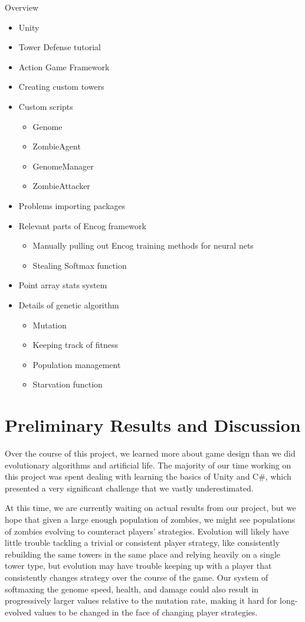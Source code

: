 \documentclass[letterpaper]{article}
\begin{document}
Overview
\begin{itemize}
    \item Unity
    \item Tower Defense tutorial
    \item Action Game Framework
    \item Creating custom towers
    \item Custom scripts
        \begin{itemize}
            \item Genome
            \item ZombieAgent
            \item GenomeManager
            \item ZombieAttacker
        \end{itemize}
    \item Problems importing packages
    \item Relevant parts of Encog framework
        \begin{itemize}
            \item Manually pulling out Encog training methods for neural nets
            \item Stealing Softmax function
        \end{itemize}
    \item Point array stats system
    \item Details of genetic algorithm
        \begin{itemize}
            \item Mutation
            \item Keeping track of fitness
            \item Population management
            \item Starvation function
        \end{itemize}
\end{itemize}


\section{Preliminary Results and Discussion}
Over the course of this project, we learned more about game design than we did evolutionary algorithms and artificial life. The majority of our time working on this project was spent dealing with learning the basics of Unity and C\#, which presented a very significant challenge that we vastly underestimated.

At this time, we are currently waiting on actual results from our project, but
we hope that given a large enough population of zombies, we might see
populations of zombies evolving to counteract players' strategies. Evolution
will likely have little trouble tackling a trivial or consistent player
strategy, like consistently rebuilding the same towers in the same place and
relying heavily on a single tower type, but evolution may have trouble keeping
up with a player that consistently changes strategy over the course of the game.
Our system of softmaxing the genome speed, health, and damage could also
result in progressively larger values relative to the mutation rate, making it
hard for long-evolved values to be changed in the face of changing player
strategies.
\end{document}
